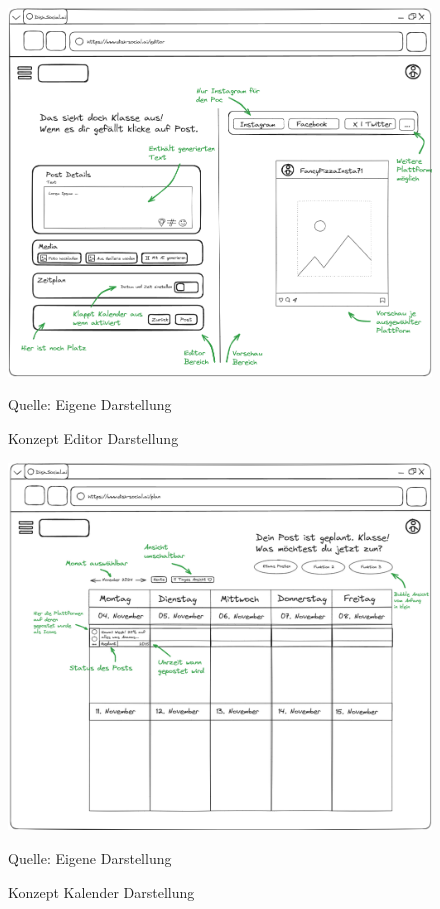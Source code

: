 \begin{figure}[htbp]
    \centering
    \includegraphics[width=\textwidth]{abbildungen/Konzept/Konzept Editor}
    \caption[]{Konzept Editor Darstellung}
    \label{fig:editor-concept}
    \raggedright Quelle: Eigene Darstellung
\end{figure}
\newpage

\begin{figure}[htbp]
    \centering
    \includegraphics[width=\textwidth]{abbildungen/Konzept/Konzept Kalender}
    \caption[]{Konzept Kalender Darstellung}
    \label{fig:calendar-concept}
    \raggedright Quelle: Eigene Darstellung
\end{figure}
\newpage

